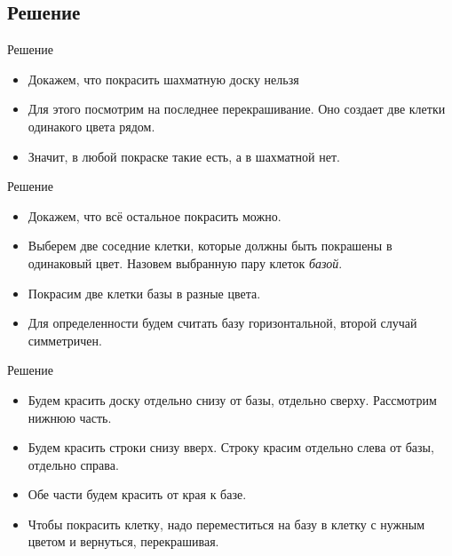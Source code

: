\subsection{Решение}

\begin{frame}[t]{Решение}
  \begin{itemize}
    \item Докажем, что покрасить шахматную доску нельзя
  \end{itemize}
  \begin{itemize}
    \item Для этого посмотрим на последнее перекрашивание. Оно создает две клетки одинакого цвета рядом.
    \item Значит, в любой покраске такие есть, а в шахматной нет.
  \end{itemize}
\end{frame}

\begin{frame}[t]{Решение}
  \begin{itemize}
    \item Докажем, что всё остальное покрасить можно.
  \end{itemize}
  \begin{itemize}
    \item Выберем две соседние клетки, которые должны быть покрашены в одинаковый цвет. Назовем выбранную пару клеток {\it базой}.
    \item Покрасим две клетки базы в разные цвета.
    \item Для определенности будем считать базу горизонтальной, второй случай симметричен.
  \end{itemize}
\end{frame}

\begin{frame}[t]{Решение}
  \begin{itemize}
    \item Будем красить доску отдельно снизу от базы, отдельно сверху. Рассмотрим нижнюю часть.
    \item Будем красить строки снизу вверх. Строку красим отдельно слева от базы,
    отдельно справа.
    \item Обе части будем красить от края к базе.
    \item Чтобы покрасить клетку, надо переместиться на базу в клетку с нужным цветом
        и вернуться, перекрашивая.
  \end{itemize}
\end{frame}

